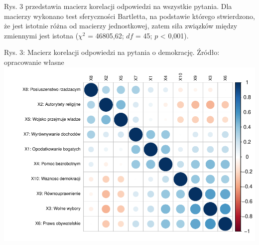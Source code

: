\documentclass[12pt]{article}
\begin{document}
Rys. 3 przedstawia macierz korelacji odpowiedzi na wszystkie pytania. Dla macierzy wykonano test sferyczności Bartletta, na podstawie którego stwierdzono, że jest istotnie różna od macierzy jednostkowej, zatem siła związków między zmiennymi jest istotna (\(\chi^2\) = 46805,62; \(df\) = 45; \(p\) \textless{} 0,001).

Rys. 3: Macierz korelacji odpowiedzi na pytania o demokrację. Źródło: opracowanie własne
\includegraphics{text_ASA_files/figure-latex/cor-matrix-1.pdf}



\end{document}
